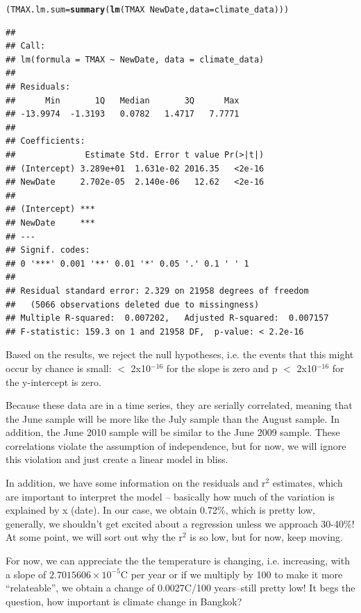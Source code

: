 \documentclass{article}\usepackage[]{graphicx}\usepackage[]{color}
\makeatletter
\newcommand{\hlopt}[1]{\textcolor[rgb]{0,0,0}{#1}}%
\newcommand{\hlstd}[1]{\textcolor[rgb]{0.345,0.345,0.345}{#1}}%
\newcommand{\hlkwb}[1]{\textcolor[rgb]{0.69,0.353,0.396}{#1}}%
\newcommand{\hlkwc}[1]{\textcolor[rgb]{0.333,0.667,0.333}{#1}}%
\newcommand{\hlkwd}[1]{\textcolor[rgb]{0.737,0.353,0.396}{\textbf{#1}}}%
\newenvironment{kframe}{%
 \def\at@end@of@kframe{}%
 \ifinner\ifhmode%
  \def\at@end@of@kframe{\end{minipage}}%
  \begin{minipage}{\columnwidth}%
 \fi\fi%
 \def\FrameCommand##1{\hskip\@totalleftmargin \hskip-\fboxsep
 \colorbox{shadecolor}{##1}\hskip-\fboxsep
     \hskip-\linewidth \hskip-\@totalleftmargin \hskip\columnwidth}%
 \MakeFramed {\advance\hsize-\width
   \@totalleftmargin\z@ \linewidth\hsize
   \@setminipage}}%
 {\par\unskip\endMakeFramed%
 \at@end@of@kframe}
\newenvironment{knitrout}{}{} %
\makeatother
\begin{document}
\begin{knitrout}
\color{fgcolor}\begin{kframe}
\begin{alltt}
\hlstd{(TMAX.lm.sum} \hlkwb{=} \hlkwd{summary}\hlstd{(}\hlkwd{lm}\hlstd{(TMAX} \hlopt{~} \hlstd{NewDate,} \hlkwc{data}\hlstd{=climate_data)))}
\end{alltt}
\begin{verbatim}
## 
## Call:
## lm(formula = TMAX ~ NewDate, data = climate_data)
## 
## Residuals:
##      Min       1Q   Median       3Q      Max 
## -13.9974  -1.3193   0.0782   1.4717   7.7771 
## 
## Coefficients:
##              Estimate Std. Error t value Pr(>|t|)
## (Intercept) 3.289e+01  1.631e-02 2016.35   <2e-16
## NewDate     2.702e-05  2.140e-06   12.62   <2e-16
##                
## (Intercept) ***
## NewDate     ***
## ---
## Signif. codes:  
## 0 '***' 0.001 '**' 0.01 '*' 0.05 '.' 0.1 ' ' 1
## 
## Residual standard error: 2.329 on 21958 degrees of freedom
##   (5066 observations deleted due to missingness)
## Multiple R-squared:  0.007202,	Adjusted R-squared:  0.007157 
## F-statistic: 159.3 on 1 and 21958 DF,  p-value: < 2.2e-16
\end{verbatim}
\end{kframe}
\end{knitrout}



Based on the results, we reject the null hypotheses, i.e. the events that this might occur by chance is small:  $<$ 2x10$^{-16}$ for the slope is zero and p $<$ 2x10$^{-16}$ for the y-intercept is zero.

Because these data are in a time series, they are serially correlated, meaning that the June sample will be more like the July sample than the August sample. In addition, the June 2010 sample will be similar to the June 2009 sample. These correlations violate the assumption of independence, but for now, we will ignore this violation and just create a linear model in bliss.

In addition, we have some information on the residuals and r$^2$ estimates, which are important to interpret the model -- basically how much of the variation is explained by x (date). In our case, we obtain 0.72\%, which is pretty low, generally, we shouldn't get excited about a regression unless we approach 30-40\%! At some point, we will sort out why the r$^2$ is so low, but for now, keep moving. 

For now, we can appreciate the the temperature is changing, i.e. increasing, with a slope of \ensuremath{2.7015606\times 10^{-5}}\degree C per year or if we multiply by 100 to make it more ``relateable'', we obtain a change of 0.0027\degree C/100 years--still pretty low! It begs the question, how important is climate change in Bangkok?
\end{document}
